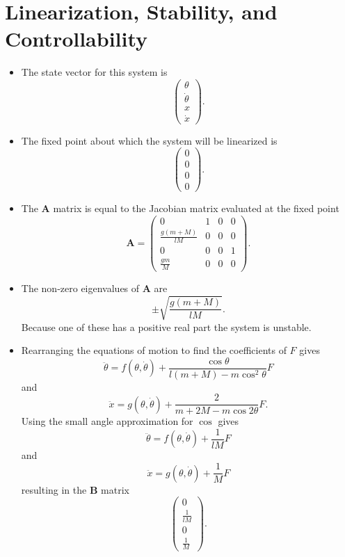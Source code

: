 \documentclass{article}
\renewcommand{\vec}[1]{\boldsymbol{\mathbf{#1}}}
\begin{document}
\section{Linearization, Stability, and Controllability}

\begin{itemize}
  \item The state vector for this system is \[\begin{pmatrix}
            \theta       \\
            \dot{\theta} \\
            x            \\
            \dot{x}
          \end{pmatrix}.\]

  \item The fixed point about which the system will be linearized is \[\begin{pmatrix}
            0 \\
            0 \\
            0 \\
            0
          \end{pmatrix}.\]

  \item The $\vec{A}$ matrix is equal to the Jacobian matrix evaluated at the fixed point \[\vec{A} = \begin{pmatrix}
            0                     & 1 & 0 & 0 \\
            \frac{g (m + M)}{l M} & 0 & 0 & 0 \\
            0                     & 0 & 0 & 1 \\
            \frac{g m}{M}         & 0 & 0 & 0
          \end{pmatrix}.\]

  \item The non-zero eigenvalues of $\vec{A}$ are \[\pm \sqrt{\frac{g (m + M)}{l M}}.\] Because one of these has a positive real part the system is unstable.

  \item Rearranging the equations of motion to find the coefficients of $F$ gives \[\ddot{\theta} = f(\theta, \dot{\theta}) + \frac{\cos \theta}{l (m + M) - m \cos^2 \theta} F\] and \[\ddot{x} = g(\theta, \dot{\theta}) + \frac{2}{m + 2 M - m \cos 2 \theta} F.\] Using the small angle approximation for $\cos$ gives \[\ddot{\theta} = f(\theta, \dot{\theta}) + \frac{1}{l M} F\] and \[\ddot{x} = g(\theta, \dot{\theta}) + \frac{1}{M} F\] resulting in the $\vec{B}$ matrix \[\begin{pmatrix}
            0             \\
            \frac{1}{l M} \\
            0             \\
            \frac{1}{M}
          \end{pmatrix}.\]


\end{itemize}
\end{document}
